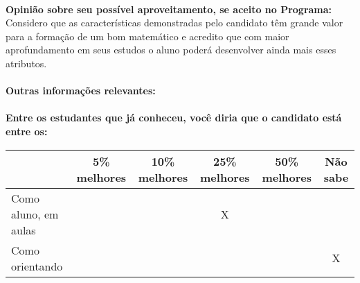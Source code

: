 \documentclass[11pt]{article}
\begin{document}
\\
\textbf{Opinião sobre seu possível aproveitamento, se aceito no Programa:}
\\Considero que as características demonstradas pelo candidato têm grande valor para a formação de um bom matemático e acredito que com maior aprofundamento em seus estudos o aluno poderá desenvolver ainda mais esses atributos.\\ 
\\
\textbf{Outras informações relevantes:} \\
\\[0.3cm]
\textbf{Entre os estudantes que já conheceu, você diria que o candidato está entre os:}
\\
\begin{tabular}{|l|c|c|c|c|c|}
\hline
 & 5\% melhores & 10\% melhores & 25\% melhores & 50\% melhores & Não sabe \\
\hline
Como aluno, em aulas &  &  & X &  & \\
\hline
Como orientando &  &  &  &  & X\\
\hline
\end{tabular}
\end{document}
